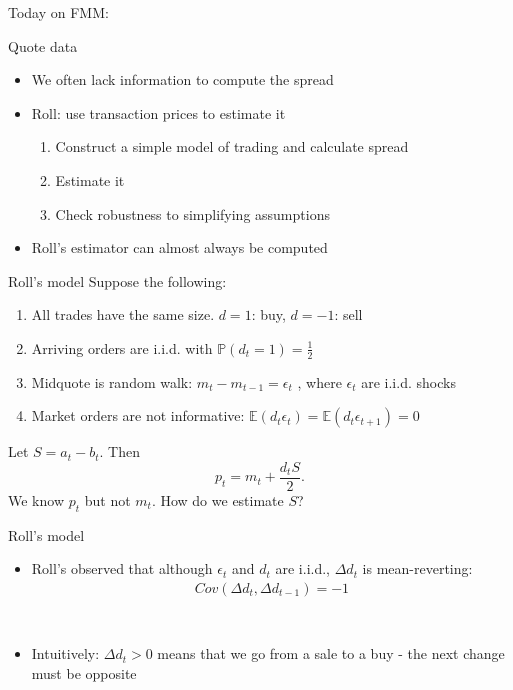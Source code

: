 \begin{frame}{Today on FMM:}
	\tableofcontents[currentsection]
\end{frame}


\begin{frame}{Quote data}
	\begin{itemize}
		\item We often lack information to compute the spread
		\item Roll: use transaction prices to estimate it
		\begin{enumerate}
			\item Construct a simple model of trading and calculate spread
			\item Estimate it
			\item Check robustness to simplifying assumptions
		\end{enumerate}
		\item Roll's estimator can almost always be computed
	\end{itemize}
\end{frame}


\begin{frame}{Roll's model}
	Suppose the following:
	\begin{enumerate}
		\item All trades have the same size. $d=1$: buy, $d=-1$: sell
		\item Arriving orders are i.i.d. with $\mathbb{P}(d_t =1)=\frac{1}{2}$
		\item Midquote is random walk: $m_t -m_{t-1} = \epsilon_t$  , where $\epsilon_t$ are i.i.d. shocks
		\item Market orders are not informative: $\mathbb{E}(d_t \epsilon_t)=\mathbb{E}(d_t \epsilon_{t+1})=0$
	\end{enumerate}
	Let $S = a_t-b_t$. Then
	\[
	p_t = m_t + \frac{d_t S}{2}.
	\]
	We know $p_t$ but not $m_t$. How do we estimate $S$?
\end{frame}


\begin{frame}{Roll's model}
	\begin{itemize}
		\item Roll's observed that although $\epsilon_t$ and $d_t$ are i.i.d., $\Delta d_t$ is mean-reverting:
		\begin{align*}
		Cov(\Delta d_t, \Delta d_{t-1})	= -1
		\\
		\\
		\\
		\\
		\\
		\end{align*}
		\item Intuitively: $\Delta d_t>0$ means that we go from a sale to a buy - the next change must be opposite
	\end{itemize}
\end{frame}


